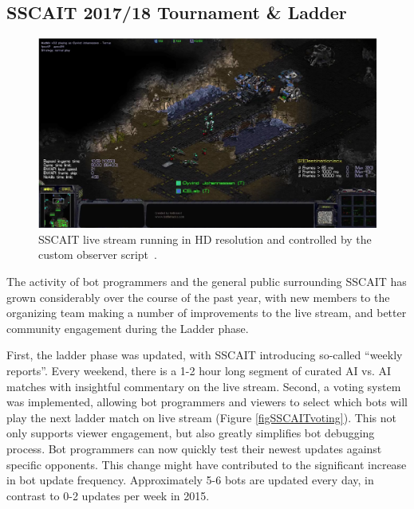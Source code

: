 \subsection{SSCAIT 2017/18 Tournament \& Ladder}\label{subsecSSCAITnews}

\begin{figure}[t]
  \centering
  \includegraphics[width=1\columnwidth]{fig/sscait-stream.png}
  \caption{SSCAIT live stream running in HD resolution and controlled by the custom observer script~\cite{mattsson2015automatic}.}
  \label{figSSCAITstream}
\end{figure}

The activity of bot programmers and the general public surrounding SSCAIT has grown considerably over the course of the past year, with new members to the organizing team making a number of improvements to the live stream, and better community engagement during the Ladder phase.

First, the ladder phase was updated, with SSCAIT introducing so-called ``weekly reports''. Every weekend, there is a 1-2 hour long segment of curated AI vs. AI matches with insightful commentary on the live stream. Second, a voting system was implemented, allowing bot programmers and viewers to select which bots will play the next ladder match on live stream (Figure \ref{figSSCAITvoting}). This not only supports viewer engagement, but also greatly simplifies bot debugging process. Bot programmers can now quickly test their newest updates against specific opponents. This change might have contributed to the significant increase in bot update frequency. Approximately 5-6 bots are updated every day, in contrast to 0-2 updates per week in 2015.

